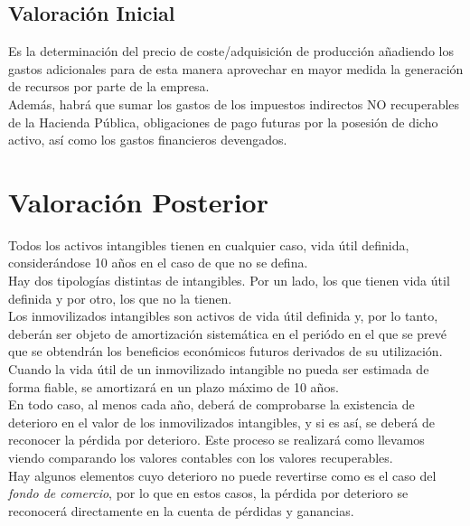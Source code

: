 \documentclass[a4paper,12pt]{article}
\begin{document}
\subsection{Valoración Inicial}
Es la determinación del precio de coste/adquisición de producción añadiendo los gastos adicionales para de esta manera aprovechar en mayor medida la generación de recursos por parte de la empresa.\\

Además, habrá que sumar los gastos de los impuestos indirectos NO recuperables de la Hacienda Pública, obligaciones de pago futuras por la posesión de dicho activo, así como los gastos financieros devengados.\\

\section{Valoración Posterior}
Todos los activos intangibles tienen en cualquier caso, vida útil definida, considerándose 10 años en el caso de que no se defina.\\

Hay dos tipologías distintas de intangibles. Por un lado, los que tienen vida útil definida y por otro, los que no la tienen.\\

Los inmovilizados intangibles son activos de vida útil definida y, por lo tanto, deberán ser objeto de amortización sistemática en el periódo en el que se prevé que se obtendrán los beneficios económicos futuros derivados de su utilización.\\

Cuando la vida útil de un inmovilizado intangible no pueda ser estimada de forma fiable, se amortizará en un plazo máximo de 10 años.\\

En todo caso, al menos cada año, deberá de comprobarse la existencia de deterioro en el valor de los inmovilizados intangibles, y si es así, se deberá de reconocer la pérdida por deterioro. Este proceso se realizará como llevamos viendo comparando los valores contables con los valores recuperables.\\

Hay algunos elementos cuyo deterioro no puede revertirse como es el caso del \textit{fondo de comercio}, por lo que en estos casos, la pérdida por deterioro se reconocerá directamente en la cuenta de pérdidas y ganancias.\\
\end{document}
